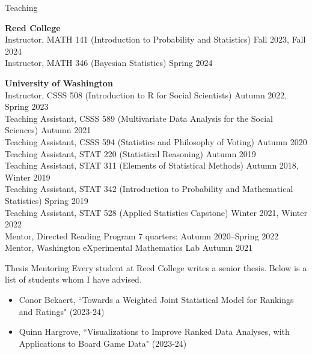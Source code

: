 \documentclass{resume} %
\begin{document}
\begin{rSection}{Teaching}

\textbf{Reed College}
\\ Instructor, MATH 141 (Introduction to Probability and Statistics) \hfill {Fall 2023, Fall 2024}
\\ Instructor, MATH 346 (Bayesian Statistics) \hfill {Spring 2024}

\textbf{University of Washington}
\\ Instructor, CSSS 508 (Introduction to R for Social Scientists) \hfill {Autumn 2022, Spring 2023}
\\ Teaching Assistant, CSSS 589 (Multivariate Data Analysis for the Social Sciences) \hfill Autumn 2021
\\ Teaching Assistant, CSSS 594 (Statistics and Philosophy of Voting) \hfill Autumn 2020
\\ Teaching Assistant, STAT 220 (Statistical Reasoning) \hfill {Autumn 2019}
\\ Teaching Assistant, STAT 311 (Elements of Statistical Methods) \hfill {Autumn 2018, Winter 2019}
\\ Teaching Assistant, STAT 342 (Introduction to Probability and Mathematical Statistics) \hfill {Spring 2019}
\\ Teaching Assistant, STAT 528 (Applied Statistics Capstone) \hfill {Winter 2021, Winter 2022}
\\ Mentor, Directed Reading Program \hfill{7 quarters; Autumn 2020--Spring 2022}
\\ Mentor, Washington eXperimental Mathematics Lab \hfill {Autumn 2021}

\end{rSection}

\begin{rSection}{Thesis Mentoring}
Every student at Reed College writes a senior thesis. Below is a list of students whom I have advised.
\begin{itemize}
\item Conor Bekaert, ``Towards a Weighted Joint Statistical Model for Rankings and Ratings" (2023-24)
\item Quinn Hargrove, ``Visualizations to Improve Ranked Data Analyses, with Applications to Board Game Data" (2023-24)
\end{itemize}

\end{rSection}
\end{document}
